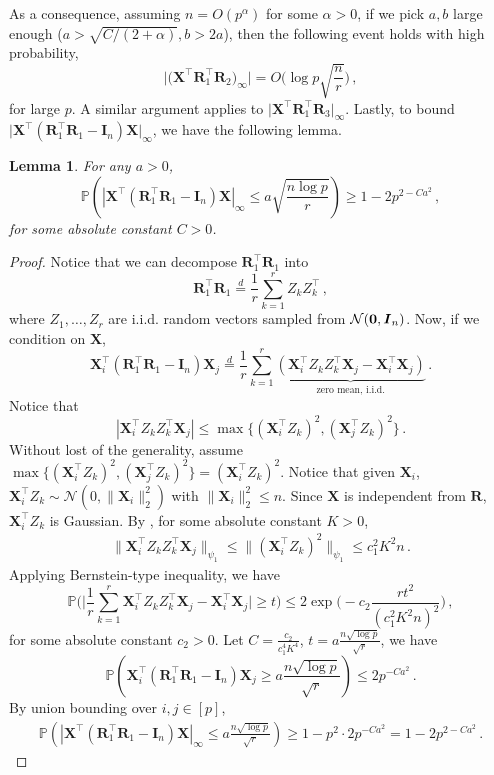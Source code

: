 \documentclass[11pt]{article}
\newtheorem{lemma}{Lemma}%
\newcommand{\bX}{\boldsymbol{X}}
\newcommand{\bI}{\boldsymbol{I}}
\newcommand{\bR}{\boldsymbol{R}}
\newcommand{\mcN}{\mathcal{N}}
\newcommand{\Prob}{\mathbb{P}}
\begin{document}
As a consequence, assuming $n=O(p^\alpha)$ for some $\alpha>0$, if we pick $a,b$ large enough ($a>\sqrt{C/(2+\alpha)},b>2a$), then the following event holds with high probability,
\begin{equation}\label{eq:boundXR}
    \big|\big(\bX^\top \bR_1^\top \bR_2\big)_\infty\big|=O\bigg(\log p \sqrt{\frac{n}{r}}\bigg)\,,
\end{equation}
for large $p$. A similar argument applies to $\big|\bX^\top \bR_1^\top \bR_3\big|_\infty$. Lastly, to bound $\big|\bX^\top(\bR_1^\top \bR_1-\bI_n)\bX\big|_\infty$, we have the following lemma. 
\begin{lemma}\label{lemma:boundXRX}
    For any $a>0$,
    \begin{equation*}
        \Prob\left(\left|\bX^\top(\bR_1^\top \bR_1-\bI_n)\bX\right|_\infty\leq a\sqrt{\frac{n\log p}{r}}\right)\geq 1-2p^{2-Ca^2}\,,
    \end{equation*}
    for some absolute constant $C>0$.
\end{lemma}
\begin{proof}
Notice that we can decompose $\bR_1^\top \bR_1$ into
\[    \bR_1^\top \bR_1 \stackrel{d}{=} \frac{1}{r}\sum_{k=1}^rZ_kZ_k^\top \,,
\]
where $Z_1,\dotsc,Z_r$ are i.i.d. random vectors sampled from $\mcN({{\bf{0}}},\bI_n)$. Now, if we condition on $\bX$,
\[\bX_i^\top(\bR_1^\top \bR_1-\bI_n)\bX_j \stackrel{d}{=} \frac{1}{r}\sum_{k=1}^r\underbrace{(\bX_i^\top Z_kZ_k^\top \bX_j-\bX_i^\top \bX_j)}_\text{zero mean, i.i.d.}\,.\]
Notice that 
\[|\bX_i^\top Z_kZ_k^\top \bX_j|\leq \max\bigg\{(\bX_i^\top Z_k)^2,(\bX_j^\top Z_k)^2\bigg\}\,.\]
Without lost of the generality, assume $\max\bigg\{(\bX_i^\top Z_k)^2,(\bX_j^\top Z_k)^2\bigg\}=(\bX_i^\top Z_k)^2$. Notice that given $\bX_i$, $\bX_i^\top Z_k\sim\mcN(0,\|\bX_i\|_2^2)$ with $\|\bX_i\|_2^2\le n$. Since $\bX$ is independent from $\bR$, $\bX_i^\top Z_k$ is Gaussian.
By \citep[Lemma 2.7.6]{vershyninHDP}, for some absolute constant $K>0$,
\begin{align*}
    \|\bX_i^\top Z_k Z_k^\top \bX_j\|_{\psi_1}\leq  \|(\bX_i^\top Z_k)^2\|_{\psi_1}
        \leq c_1^2K^2n\,.
\end{align*}
Applying Bernstein-type inequality, we have 
\[    \Prob\bigg(\bigg|\frac{1}{r}\sum_{k=1}^r\bX_i^\top Z_kZ_k^\top \bX_j-\bX_i^\top \bX_j\bigg|\geq t\bigg)\leq 2 \exp\bigg(-c_2\frac{rt^2}{(c_1^2K^2n)^2}\bigg)\,,
\]
for some absolute constant $c_2>0$. Let $C=\frac{c_2}{c_1^4K^4}$, $t=a\frac{n\sqrt{\log p}}{\sqrt{r}}$, we have 
\[ \Prob\left(\bX_i^\top (\bR_1^\top \bR_1-\bI_n)\bX_j\geq a\frac{n\sqrt{\log p}}{\sqrt{r}} \right)\leq 2p^{-Ca^2}\,.\]
By union bounding over $i,j\in[p]$,
\begin{align*}
    \Prob\left( |\bX^\top (\bR_1^\top \bR_1-\bI_n)\bX|_{\infty} \leq a\frac{n\sqrt{\log p}}{\sqrt{r}}\right)\ge  1-p^2\cdot2p^{-Ca^2}
        =1-2p^{2-Ca^2}\,.
\end{align*}
\end{proof}
\end{document}
